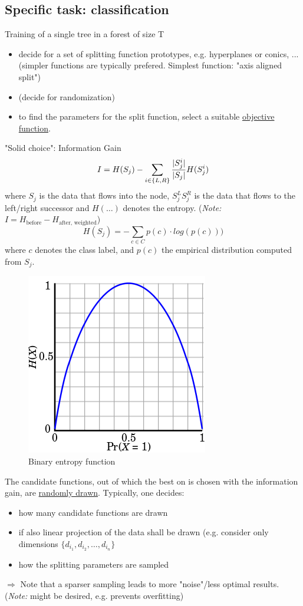 \documentclass{scrartcl}
\DeclarePairedDelimiter\abs{\lvert}{\rvert}%
\begin{document}
\subsection{Specific task: classification}
Training of a single tree in a forest of size T
\begin{itemize}
    \item
        decide for a set of splitting function prototypes, e.g. hyperplanes or conics, ... (simpler functions are typically prefered. Simplest function: "axis aligned split")
    \item
        (decide for randomization)
    \item
        to find the parameters for the split function, select a suitable \underline{objective function}. 
\end{itemize}
"Solid choice": Information Gain
\[I = H(S_j) - \sum_{i \in \{L,R\}} \frac{\abs{S^i_j}}{\abs{S_j}} H(S^i_j)\]
where \(S_j\) is the data that flows into the node, \(S^L_j S^R_j\) is the data that flows to the left/right successor and \(H(\dots)\) denotes the entropy. (\textit{Note:} \(I = H_{\text{before}} - H_{\text{after, weighted}}\))
\[H(S_j) = -\sum_{c \in C} p(c) \cdot log(p(c)))\] 
where \(c\) denotes the class label, and \(p(c)\) the empirical distribution computed from \(S_j\). 

\begin{figure}[ht]
	\centering
    \includegraphics[scale=0.5]{img/entropy.png}
	\caption{Binary entropy function}
	\label{fig:entropy}
\end{figure}



The candidate functions, out of which the best on is chosen with the information gain, are \underline{randomly drawn}. Typically, one decides:
\begin{itemize}
    \item
        how many candidate functions are drawn
    \item
        if also linear projection of the data shall be drawn (e.g. consider only dimensions \(\{d_{i_1}, d_{i_2}, \dots, d_{i_n}\}\)
    \item
        how the splitting parameters are sampled
\end{itemize}
\(\Rightarrow\) Note that a sparser sampling leads to more "noise"/less optimal results. (\textit{Note:} might be desired, e.g. prevents overfitting)
\end{document}
